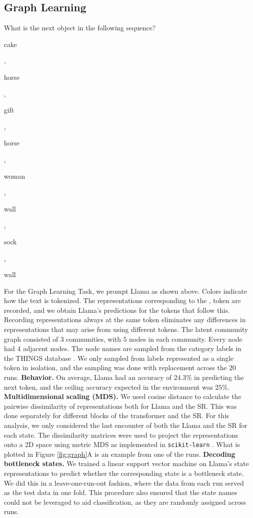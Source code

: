 \documentclass{article}
\begin{document}
\subsection{Graph Learning}\label{appendix:graph}
\begin{tcolorbox}[rounded corners, colback=mGreen!0!white,colframe=mGreen!75!black, width=\textwidth, title=\textbf{Prompt} \label{fig:glprompt}]
What is the next object in the following sequence?
\colorbox{token1}{\strut cake}\colorbox{token2}{\strut,}\colorbox{token3}{\strut horse}\colorbox{token2}{\strut,}\colorbox{token4}{\strut gift}\colorbox{token2}{\strut,}\colorbox{token3}{\strut horse}\colorbox{token2}{\strut,}\colorbox{token5}{\strut woman}\colorbox{token2}{\strut,}\colorbox{token6}{\strut wall}\colorbox{token2}{\strut,}\colorbox{token7}{\strut sock}\colorbox{token2}{\strut,}\colorbox{token6}{\strut wall}
\end{tcolorbox}
For the Graph Learning Task, we prompt Llama as shown above. Colors indicate how the text is tokenized. The representations corresponding to the \colorbox{token2}{,} token are recorded, and we obtain Llama's predictions for the tokens that follow this. Recording representations always at the same token eliminates any differences in representations that may arise from using different tokens.
The latent community graph consisted of $3$ communities, with $5$ nodes in each community. Every node had $4$ adjacent nodes. The node names are sampled from the category labels in the THINGS database \citep{hebart_things_2019}. We only sampled from labels represented as a single token in isolation, and the sampling was done with replacement across the $20$ runs.
\textbf{Behavior.} On average, Llama had an accuracy of $24.3\%$ in predicting the next token, and the ceiling accuracy expected in the environment was $25\%$.
\textbf{Multidimensional scaling (MDS).} We used cosine distance to calculate the pairwise dissimilarity of representations both for Llama and the SR. This was done separately for different blocks of the transformer and the SR. For this analysis, we only considered the last encounter of both the Llama and the SR for each state. The dissimilarity matrices were used to project the representations onto a 2D space using metric MDS as implemented in \texttt{scikit-learn} \citep{pedregosa2011scikit}. What is plotted in Figure \ref{fig:graph}A is an example from one of the runs.
\textbf{Decoding bottleneck states.} We trained a linear support vector machine on Llama's state representations to predict whether the corresponding state is a bottleneck state. We did this in a leave-one-run-out fashion, where the data from each run served as the test data in one fold. This procedure also ensured that the state names could not be leveraged to aid classification, as they are randomly assigned across runs.
\end{document}
